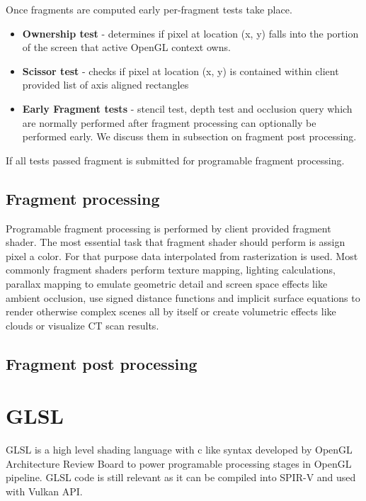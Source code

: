 Once fragments are computed early per-fragment tests take place.

\begin{itemize}
    \item \textbf{Ownership test} - determines if pixel at location (x, y) falls into the portion of the screen that active OpenGL context owns.
    \item \textbf{Scissor test} - checks if pixel at location (x, y) is contained within client provided list of axis aligned rectangles
    \item \textbf{Early Fragment tests} - stencil test, depth test and occlusion query which are normally performed after fragment processing can optionally be performed early. We discuss them in subsection on fragment post processing.
\end{itemize}

If all tests passed fragment is submitted for programable fragment processing.

\subsection{Fragment processing}

Programable fragment processing is performed by client provided fragment shader. The most essential task that fragment shader should perform is assign pixel a color.
For that purpose data interpolated from rasterization is used. 
Most commonly fragment shaders perform texture mapping, lighting calculations, parallax mapping to emulate geometric detail and screen space effects like ambient occlusion, 
use signed distance functions and implicit surface equations to render otherwise complex scenes all by itself or create volumetric effects like clouds or visualize CT scan results.

\subsection{Fragment post processing}


\section{GLSL}

GLSL is a high level shading language with c like syntax developed by OpenGL Architecture Review Board to power programable processing stages in OpenGL pipeline. 
GLSL code is still relevant as it can be compiled into SPIR-V and used with Vulkan API.

